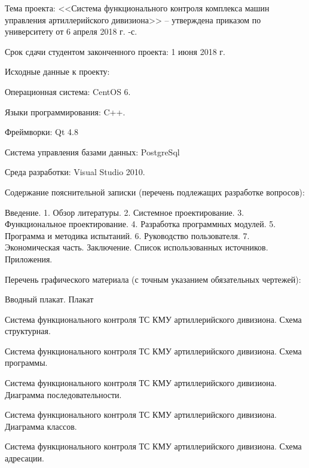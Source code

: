 {    %
	    \begin{legal}[leftmargin=*,label={\arabic*}]
	    \item Тема проекта: <<Система функционального контроля комплекса машин управления артиллерийского дивизиона>> --
		    утверждена приказом по университету от 6 апреля 2018 г. -с.

		    \vspace{1em}

	    \item Срок сдачи студентом законченного проекта: 1 июня 2018 г.

		    \vspace{1em}

	    \item Исходные данные к проекту:

		    \begin{legal}[label*={.\arabic*}]
		    \item Операционная система: CentOS 6.
		    \item Языки программирования: C++.
		    \item Фреймворки: Qt 4.8
		    \item Система управления базами данных: PostgreSql
		    \item Среда разработки: Visual Studio 2010.
		    \end{legal}

		    \vspace{1em}

	    \item Содержание пояснительной записки (перечень подлежащих разработке вопросов):

		    Введение.
		    1. Обзор литературы.
		    2. Системное проектирование.
		    3. Функциональное проектирование.
		    4. Разработка программных модулей.
		    5. Программа и методика испытаний.
		    6. Руководство пользователя.
		    7. Экономическая часть.
		    Заключение.
		    Список использованных источников.
		    Приложения.

		    \vspace{1em}

			    \clearpage
			    \thispagestyle{empty}
	    \item Перечень графического материала (с точным указанием обязательных чертежей):
		    \begin{legal}[label*={.\arabic*}]
		    \item Вводный плакат. Плакат
		    \item Система функционального контроля ТС КМУ артиллерийского дивизиона. Схема структурная.
		    \item Система функционального контроля ТС КМУ артиллерийского дивизиона. Схема программы.
		    \item Система функционального контроля ТС КМУ артиллерийского дивизиона. Диаграмма последовательности.
		    \item Система функционального контроля ТС КМУ артиллерийского дивизиона. Диаграмма классов.
		    \item Система функционального контроля ТС КМУ артиллерийского дивизиона. Схема адресации.
		    \end{legal}


\end{legal}}
